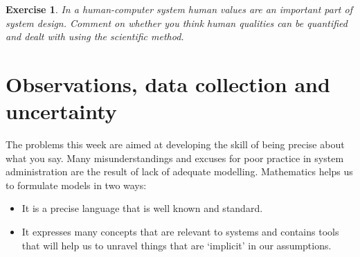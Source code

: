 \documentclass{book}
\newtheorem{exercise}{Exercise}
\begin{document}
\begin{exercise}
In a human-computer system human values are an important part of
system design.
Comment on whether you think human qualities can be quantified and
dealt with using the scientific method.
\end{exercise}
\begin{solution}
\end{solution}



\chapter{ Observations, data collection and uncertainty}

The problems this week are aimed at developing the skill of being
precise about what you say. Many misunderstandings and excuses for
poor practice in system administration are the result of lack
of adequate modelling. Mathematics helps us to formulate models in two ways:
\begin{itemize}
\item It is a precise language that is well known and standard.
\item It expresses many concepts that are relevant to systems and contains tools that will help us to unravel things that are `implicit' in our assumptions.
\end{itemize}
\end{document}
